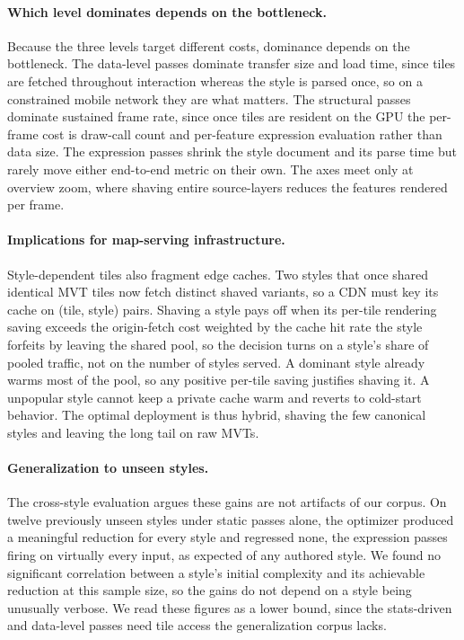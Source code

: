 \paragraph*{Which level dominates depends on the bottleneck.}
Because the three levels target different costs, dominance depends on the bottleneck.
The data-level passes dominate transfer size and load time, since tiles are fetched throughout interaction whereas the style is parsed once, so on a constrained mobile network they are what matters.
The structural passes dominate sustained frame rate, since once tiles are resident on the GPU the per-frame cost is draw-call count and per-feature expression evaluation rather than data size.
The expression passes shrink the style document and its parse time but rarely move either end-to-end metric on their own.
The axes meet only at overview zoom, where shaving entire source-layers reduces the features rendered per frame.

\paragraph*{Implications for map-serving infrastructure.}
Style-dependent tiles also fragment edge caches.
Two styles that once shared identical \ac{MVT} tiles now fetch distinct shaved variants, so a \ac{CDN} must key its cache on (tile, style) pairs.
Shaving a style pays off when its per-tile rendering saving exceeds the origin-fetch cost weighted by the cache hit rate the style forfeits by leaving the shared pool, so the decision turns on a style's share of pooled traffic, not on the number of styles served.
A dominant style already warms most of the pool, so any positive per-tile saving justifies shaving it.
A unpopular style cannot keep a private cache warm and reverts to cold-start behavior.
The optimal deployment is thus hybrid, shaving the few canonical styles and leaving the long tail on raw \acp{MVT}.

\paragraph*{Generalization to unseen styles.}
The cross-style evaluation argues these gains are not artifacts of our corpus.
On twelve previously unseen styles under static passes alone, the optimizer produced a meaningful reduction for every style and regressed none, the expression passes firing on virtually every input, as expected of any authored style.
We found no significant correlation between a style's initial complexity and its achievable reduction at this sample size, so the gains do not depend on a style being unusually verbose.
We read these figures as a lower bound, since the stats-driven and data-level passes need tile access the generalization corpus lacks.

